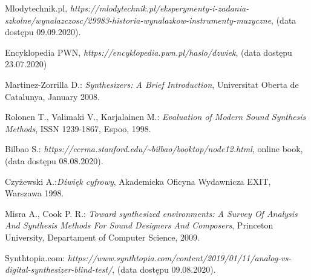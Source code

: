 \documentclass[nostrict]{szablonPG}
\begin{document}



	\setcounter{page}{3}
	\let\cleardoublepage\clearpage
	
	
	
	
	
	
	
	
	
	
	
%	
	
	
%	
%	
	

	\listoffigures      %
	\listoftables

	\begin{thebibliography}{20}                      %
		\small              %
		Mlodytechnik.pl, \emph{https://mlodytechnik.pl/eksperymenty-i-zadania-szkolne/wynalazczosc/29983-historia-wynalazkow-instrumenty-muzyczne}, (data dostępu 09.09.2020).
		
		Encyklopedia PWN, \emph{https://encyklopedia.pwn.pl/haslo/dzwiek}, (data dostępu 23.07.2020)
		
		Martinez-Zorrilla D.: \emph{Synthesizers: A Brief Introduction}, Universitat Oberta de Catalunya, January 2008.

		Rolonen T., Valimaki V., Karjalainen M.: \emph{Evaluation of Modern Sound Synthesis Methods}, ISSN 1239-1867, Espoo, 1998.

		Bilbao S.: \emph{https://ccrma.stanford.edu/\textasciitilde bilbao/booktop/node12.html}, online book, (data dostępu 08.08.2020).
		
		Czyżewski A.:\emph{Dźwięk cyfrowy}, Akademicka Oficyna Wydawnicza EXIT, Warszawa 1998.
		 
		Misra A., Cook P. R.: \emph{Toward synthesized environments: A Survey Of Analysis And Synthesis Methods For Sound Designers And Composers}, Princeton University, Departament of Computer Science, 2009.
		
		Synthtopia.com: \emph{https://www.synthtopia.com/content/2019/01/11/analog-vs-digital-synthesizer-blind-test/}, (data dostępu 09.08.2020).


\end{thebibliography}
\end{document}
